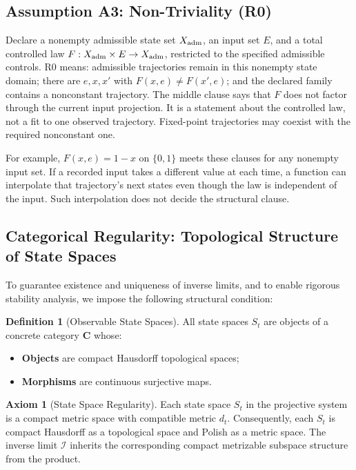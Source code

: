 \documentclass[11pt,a4paper]{article}
\theoremstyle{plain}
\theoremstyle{definition}
\newtheorem{definition}[theorem]{Definition}
\newtheorem{axiom}[theorem]{Axiom}
\theoremstyle{remark}
\begin{document}
\subsection{Assumption A3: Non-Triviality (R0)}

Declare a nonempty admissible state set $X_{\rm adm}$, an input set $E$, and a total controlled law $F:X_{\rm adm}\times E\to X_{\rm adm}$, restricted to the specified admissible controls. R0 means: admissible trajectories remain in this nonempty state domain; there are $e,x,x'$ with $F(x,e)\ne F(x',e)$; and the declared family contains a nonconstant trajectory. The middle clause says that $F$ does not factor through the current input projection. It is a statement about the controlled law, not a fit to one observed trajectory. Fixed-point trajectories may coexist with the required nonconstant one.

For example, $F(x,e)=1-x$ on $\{0,1\}$ meets these clauses for any nonempty input set. If a recorded input takes a different value at each time, a function can interpolate that trajectory's next states even though the law is independent of the input. Such interpolation does not decide the structural clause.

\subsection{Categorical Regularity: Topological Structure of State Spaces}

To guarantee existence and uniqueness of inverse limits, and to enable rigorous stability analysis, we impose the following structural condition:

\begin{definition}[Observable State Spaces]\label{def:obs-spaces}
All state spaces $S_t$ are objects of a concrete category $\mathbf{C}$ whose:
\begin{itemize}[leftmargin=*]
    \item \textbf{Objects} are compact Hausdorff topological spaces;
    \item \textbf{Morphisms} are continuous surjective maps.
\end{itemize}
\end{definition}

\begin{axiom}[State Space Regularity]\label{ax:state-space-regularity}
Each state space $S_t$ in the projective system is a compact metric space with compatible metric $d_t$. Consequently, each $S_t$ is compact Hausdorff as a topological space and Polish as a metric space. The inverse limit $\mathcal{I}$ inherits the corresponding compact metrizable subspace structure from the product.
\end{axiom}
\end{document}
